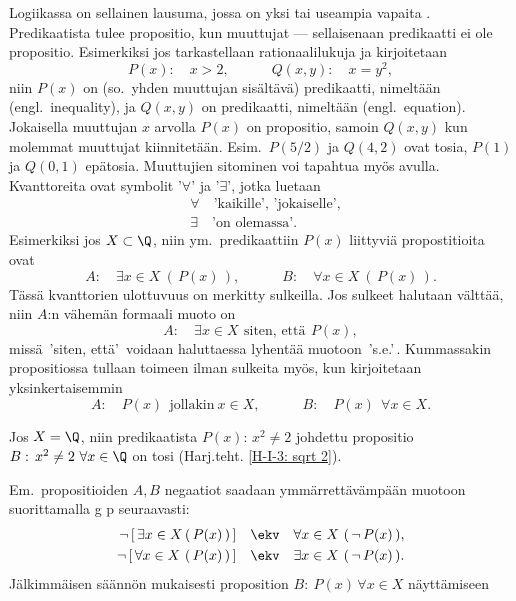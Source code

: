 Logiikassa  on sellainen lausuma, jossa on yksi tai useampia vapaita 
. Predikaatista tulee propositio, kun muuttujat  --- sellaisenaan
predikaatti ei ole propositio. Esimerkiksi jos tarkastellaan rationaalilukuja ja kirjoitetaan
\[
P(x): \quad x>2, \quad\quad\quad Q(x,y): \quad x=y^2,
\]
niin $P(x)$ on  (so.\ yhden muuttujan sisältävä) predikaatti, nimeltään 
 (engl.\ inequality), ja $Q(x,y)$ on  predikaatti, nimeltään
 (engl.\ equation). Jokaisella muuttujan $x$ arvolla $P(x)$ on propositio, samoin 
$Q(x,y)$ kun molemmat muuttujat kiinnitetään. Esim.\ $P(5/2)$ ja $Q(4,2)$ ovat tosia, $P(1)$ ja
$Q(0,1)$ epätosia. Muuttujien sitominen voi tapahtua myös  avulla. Kvanttoreita
ovat symbolit '$\forall$' ja '$\exists$', jotka luetaan
\begin{align*}
&\forall \quad \text{'kaikille', 'jokaiselle'}, \\
&\exists \quad \text{'on olemassa'}.
\end{align*}
Esimerkiksi jos $X \subset \Q$, niin ym.\ predikaattiin $P(x)$ liittyviä propostitioita ovat
\[
A: \quad \exists x \in X\ (\,P(x)\,), \quad\quad\quad B: \quad \forall x \in X\ (\,P(x)\,).
\]
Tässä kvanttorien ulottuvuus on merkitty sulkeilla. Jos sulkeet halutaan välttää, niin $A$:n 
vähemän formaali muoto on
\[
A: \quad \exists x \in X\ \,\text{siten, että}\ \,P(x),
\]
missä \,'siten, että'\, voidaan haluttaessa lyhentää muotoon \,'s.e.'\,. Kummassakin 
propositiossa tullaan toimeen ilman sulkeita myös, kun kirjoitetaan yksinkertaisemmin
\[
A: \quad P(x)\ \ \text{jollakin}\ x \in X, \quad\quad\quad B: \quad P(x)\ \ \forall x \in X.
\]
\begin{Exa} Jos $X=\Q$, niin predikaatista $P(x):\,x^2 \neq 2$ johdettu propositio 
$B:\,x^2 \neq 2\ \forall x\in\Q$ on tosi (Harj.teht. \ref{H-I-3: sqrt 2}). \loppu
\end{Exa}
Em.\ propositioiden $A,B$ negaatiot saadaan ymmärrettävämpään muotoon suorittamalla
g p seuraavasti:
\begin{align*}
\neg\,[\,\exists x \in X\,(\,P(x)\,)\,] \quad 
                 &\ekv \quad \forall x \in X\ (\,\neg\,P(x)\,), \\
\neg\,[\,\forall x \in X\ (\,P(x)\,)\,] \quad 
                 &\ekv \quad \exists x \in X\ (\,\neg\,P(x)\,).
\end{align*}
Jälkimmäisen säännön mukaisesti proposition $B:\ P(x)\,\forall x \in X$ näyttämiseen 

